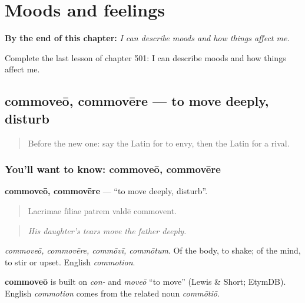 
\chapter{Moods and feelings}
\label{ch:la-moods-and-feelings}

\begin{chapteropening}
\textbf{By the end of this chapter:} \emph{I can describe moods and how things affect me.}

Complete the last lesson of chapter 501: I can describe moods and how things affect me.
\end{chapteropening}

\section[commoveō, commovēre]{commoveō, commovēre — to move deeply, disturb}

\label{lesson:LA-C501-commoveo}



\begin{quote}
Before the new one: say the Latin for to envy, then the Latin for a rival.
\end{quote}

\subsection*{You'll want to know: commoveō, commovēre}
\textbf{commoveō, commovēre} — \textquotedblleft{}to move deeply, disturb\textquotedblright{}.

\begin{quote}
Lacrimae fīliae patrem valdē commovent.
\end{quote}

\begin{quote}
\emph{His daughter's tears move the father deeply.}
\end{quote}

\emph{commoveō, commovēre, commōvī, commōtum}. Of the body, to shake; of the mind, to stir or upset. English \emph{commotion}.

\begin{cousinweb}
\textbf{commoveō} is built on \emph{con-} and \emph{moveō} \textquotedblleft{}to move\textquotedblright{} (Lewis \& Short; EtymDB). English \emph{commotion} comes from the related noun \emph{commōtiō}.
\end{cousinweb}

